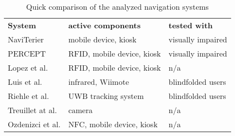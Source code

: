 \begin{table}[htbp]
  \centering
  \caption{Quick comparison of the analyzed navigation systems}
  \label{tab:navSysComp}
 \renewcommand{\arraystretch}{1.2}
    \begin{tabularx}{\textwidth}{p{2.6cm}|X|X}
    \rowcolor{mygray}
    \textbf{System} & \textbf{active components} & \textbf{tested with} \\
    NaviTerier & mobile device, kiosk & visually impaired  \\ \hline
    PERCEPT & RFID, mobile device, kiosk & visually impaired  \\ \hline
    Lopez et al. & RFID, mobile device, kiosk & n/a \\ \hline
    Luis et al. & infrared, Wiimote & blindfolded users \\ \hline
    Riehle et al. & UWB tracking system & blindfolded users \\ \hline
    Treuillet at al. & camera & n/a \\ \hline
    Ozdenizci et al. & NFC, mobile device, kiosk & n/a \\
    \end{tabularx}%
\end{table}%

